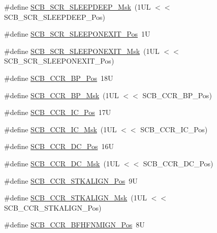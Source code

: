 \begin{DoxyCompactItemize}
\item 
\#define \hyperlink{group___c_m_s_i_s___s_c_b_ga77c06a69c63f4b3f6ec1032e911e18e7}{S\+C\+B\+\_\+\+S\+C\+R\+\_\+\+S\+L\+E\+E\+P\+D\+E\+E\+P\+\_\+\+Msk}~(1\+U\+L $<$$<$ S\+C\+B\+\_\+\+S\+C\+R\+\_\+\+S\+L\+E\+E\+P\+D\+E\+E\+P\+\_\+\+Pos)
\item 
\#define \hyperlink{group___c_m_s_i_s___s_c_b_ga3680a15114d7fdc1e25043b881308fe9}{S\+C\+B\+\_\+\+S\+C\+R\+\_\+\+S\+L\+E\+E\+P\+O\+N\+E\+X\+I\+T\+\_\+\+Pos}~1U
\item 
\#define \hyperlink{group___c_m_s_i_s___s_c_b_ga50a243e317b9a70781b02758d45b05ee}{S\+C\+B\+\_\+\+S\+C\+R\+\_\+\+S\+L\+E\+E\+P\+O\+N\+E\+X\+I\+T\+\_\+\+Msk}~(1\+U\+L $<$$<$ S\+C\+B\+\_\+\+S\+C\+R\+\_\+\+S\+L\+E\+E\+P\+O\+N\+E\+X\+I\+T\+\_\+\+Pos)
\item 
\#define \hyperlink{group___c_m_s_i_s___s_c_b_ga2a729c850e865d602bbf25852c7d44fe}{S\+C\+B\+\_\+\+C\+C\+R\+\_\+\+B\+P\+\_\+\+Pos}~18U
\item 
\#define \hyperlink{group___c_m_s_i_s___s_c_b_ga7fac248cabee94546aa9530d27217772}{S\+C\+B\+\_\+\+C\+C\+R\+\_\+\+B\+P\+\_\+\+Msk}~(1\+U\+L $<$$<$ S\+C\+B\+\_\+\+C\+C\+R\+\_\+\+B\+P\+\_\+\+Pos)
\item 
\#define \hyperlink{group___c_m_s_i_s___s_c_b_ga33f0f2a0818b2570f3e00b7e79501448}{S\+C\+B\+\_\+\+C\+C\+R\+\_\+\+I\+C\+\_\+\+Pos}~17U
\item 
\#define \hyperlink{group___c_m_s_i_s___s_c_b_gaf2ff8f5957edac919e28b536aa6c0a59}{S\+C\+B\+\_\+\+C\+C\+R\+\_\+\+I\+C\+\_\+\+Msk}~(1\+U\+L $<$$<$ S\+C\+B\+\_\+\+C\+C\+R\+\_\+\+I\+C\+\_\+\+Pos)
\item 
\#define \hyperlink{group___c_m_s_i_s___s_c_b_gaa1896a99252649cfb96139b56ba87d9b}{S\+C\+B\+\_\+\+C\+C\+R\+\_\+\+D\+C\+\_\+\+Pos}~16U
\item 
\#define \hyperlink{group___c_m_s_i_s___s_c_b_ga57b3909dff40a9c28ec50991e4202678}{S\+C\+B\+\_\+\+C\+C\+R\+\_\+\+D\+C\+\_\+\+Msk}~(1\+U\+L $<$$<$ S\+C\+B\+\_\+\+C\+C\+R\+\_\+\+D\+C\+\_\+\+Pos)
\item 
\#define \hyperlink{group___c_m_s_i_s___s_c_b_gac2d20a250960a432cc74da59d20e2f86}{S\+C\+B\+\_\+\+C\+C\+R\+\_\+\+S\+T\+K\+A\+L\+I\+G\+N\+\_\+\+Pos}~9U
\item 
\#define \hyperlink{group___c_m_s_i_s___s_c_b_ga33cf22d3d46af158a03aad25ddea1bcb}{S\+C\+B\+\_\+\+C\+C\+R\+\_\+\+S\+T\+K\+A\+L\+I\+G\+N\+\_\+\+Msk}~(1\+U\+L $<$$<$ S\+C\+B\+\_\+\+C\+C\+R\+\_\+\+S\+T\+K\+A\+L\+I\+G\+N\+\_\+\+Pos)
\item 
\#define \hyperlink{group___c_m_s_i_s___s_c_b_ga4010a4f9e2a745af1b58abe1f791ebbf}{S\+C\+B\+\_\+\+C\+C\+R\+\_\+\+B\+F\+H\+F\+N\+M\+I\+G\+N\+\_\+\+Pos}~8U

\end{DoxyCompactItemize}

